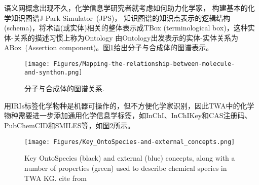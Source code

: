 语义网概念出现不久，化学信息学研究者就考虑如何助力化学家，%
构建基本的化学知识图谱\textrm{J-Park Simulator~(JPS)}，%
知识图谱的知识点表示的逻辑结构\textrm{(schema)}，将术语(或实体)相关的整体表示成\textrm{TBox}%
\textrm{(terminological box)}，这种实体-关系的描述习惯上称为\textrm{Ontology}%
由\textrm{Ontology}出发表示的实体-实体关系为\textrm{ABox~(Assertion component)}。图\ref{Fig:Mapping-relationship-molecule-synthon}给出分子与合成体的图谱表示。 
\begin{figure}[h!]
\centering
\texttt{[image: Figures/Mapping-the-relationship-between-molecule-and-synthon.png]}
\caption{\small\textrm{分子与合成体的图谱关系. }}%
\label{Fig:Mapping-relationship-molecule-synthon}
\end{figure}

用\textrm{IRIs}标签化学物种是机器可操作的，但不方便化学家识别，因此\textrm{TWA}中的化学物种需要进一步添加通用化学信息学标签，如\textrm{\textrm{InChI}}、\textrm{InChIKey}和\textrm{CAS}注册码、\textrm{PubChemCID}和\textrm{SMILES}等，如图\ref{Fig:Key-OntoSpecies-and-external-concepts}所示。
\begin{figure}[h!]
\centering
\texttt{[image: Figures/Key\_OntoSpecies-and-external\_concepts.png]}
\caption{\small\textrm{Key OntoSpecies (black) and external (blue) concepts, along with a number of properties (green) used to describe chemical species in TWA KG. cite from~\cite{ACR56-128_2023}}}%
\label{Fig:Key-OntoSpecies-and-external-concepts}
\end{figure}

